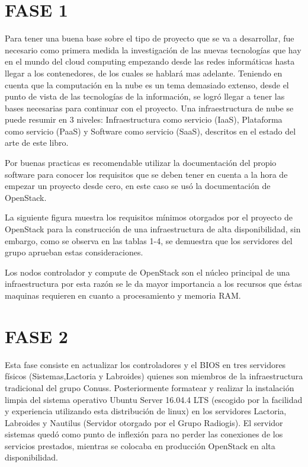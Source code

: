     \section{FASE 1} 
    Para tener una buena base sobre el tipo de proyecto que se va a desarrollar, fue necesario como primera medida la investigación de las nuevas tecnologías que hay en el mundo del cloud computing empezando desde las redes informáticas hasta llegar a los contenedores, de los cuales se hablará mas adelante. Teniendo en cuenta que la computación en la nube es un tema demasiado extenso, desde el punto de vista de las tecnologías de la información, se logró llegar a tener las bases necesarias para continuar con el proyecto. Una infraestructura de nube se puede resumir en 3 niveles: Infraestructura como servicio (IaaS), Plataforma como servicio (PaaS) y Software como servicio (SaaS), descritos en el estado del arte de este libro.
    
    Por buenas practicas es recomendable utilizar la documentación del propio software para conocer los requisitos que se deben tener en cuenta a la hora de empezar un proyecto desde cero, en este caso se usó la documentación de OpenStack. 
    
    La siguiente figura muestra los requisitos mínimos otorgados por el proyecto de OpenStack para la construcción de una infraestructura de alta disponibilidad, sin embargo, como se observa en las tablas 1-4, se demuestra que los servidores del grupo aprueban estas consideraciones.
    
   
    \label{fig:RequisitOS}
  
  Los nodos controlador y compute de OpenStack son el núcleo principal de una infraestructura por esta razón se le da mayor importancia a los recursos que éstas maquinas requieren en cuanto a procesamiento y memoria RAM. 
  
  \section{FASE 2} 
    
    Esta fase consiste en actualizar los controladores y el BIOS en tres servidores físicos (Sistemas,Lactoria y Labroides) quienes son miembros de la infraestructura tradicional del grupo Conuss. Posteriormente formatear y realizar la instalación limpia del sistema operativo Ubuntu Server 16.04.4 LTS (escogido por la facilidad y experiencia utilizando esta distribución de linux) en los servidores Lactoria, Labroides y Nautilus (Servidor otorgado por el Grupo Radiogis). El servidor sistemas quedó como punto de inflexión para no perder las conexiones de los servicios prestados, mientras se colocaba en producción OpenStack en alta disponibilidad.
    
